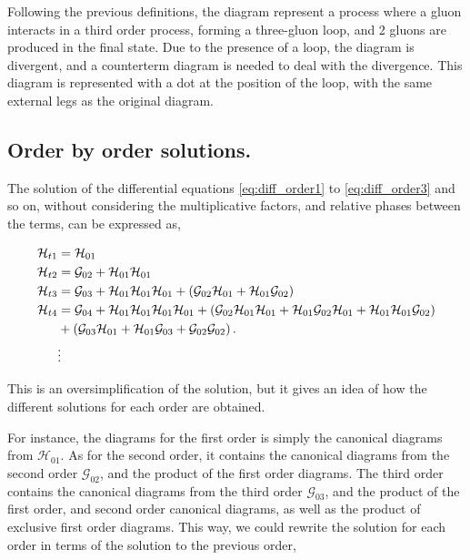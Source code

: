\documentclass[11pt,a4paper,twoside,pdf]{article}
\numberwithin{equation}{section}
\begin{document}
Following the previous definitions, the diagram represent a process where a gluon
interacts in a third order process, forming a three-gluon loop, and 2 gluons are 
produced in the final state. Due to the presence of a loop, the diagram is
divergent, and a counterterm diagram is needed to deal with the divergence. This 
diagram is represented with a dot at the position of the loop, with the same 
external legs as the original diagram. 

\subsection{Order by order solutions.} \label{sec:orderbyorder_solutions}

The solution of the differential equations \eqref{eq:diff_order1} to \eqref{eq:diff_order3} 
and so on, without considering the multiplicative factors, and relative phases between
the terms, can be expressed as,

\begin{align}
    \mathcal{H}_{t1} & = \mathcal{H}_{01} \\
    \mathcal{H}_{t2} & = \mathcal{G}_{02} + \mathcal{H}_{01} 
    \mathcal{H}_{01}\\
    \mathcal{H}_{t3} & = \mathcal{G}_{03} + \mathcal{H}_{01} \mathcal{H}_{01}
    \mathcal{H}_{01} + \left( \mathcal{G}_{02} \mathcal{H}_{01} + 
    \mathcal{H}_{01} \mathcal{G}_{02} \right)\\
    \mathcal{H}_{t4} & = \mathcal{G}_{04} + \mathcal{H}_{01} \mathcal{H}_{01}
    \mathcal{H}_{01} \mathcal{H}_{01} + \left( \mathcal{G}_{02} 
    \mathcal{H}_{01} \mathcal{H}_{01} +  \mathcal{H}_{01} \mathcal{G}_{02}
    \mathcal{H}_{01} + \mathcal{H}_{01} \mathcal{H}_{01} \mathcal{G}_{02} \right) \nonumber\\
    & + \left( \mathcal{G}_{03} \mathcal{H}_{01} + \mathcal{H}_{01} 
    \mathcal{G}_{03} + \mathcal{G}_{02}\mathcal{G}_{02} \right). \\
    &\vdots  \nonumber
\end{align}

This is an oversimplification of the solution, but it gives an idea of how the 
different solutions for each order are obtained. 

For instance, the diagrams for the first order is simply the canonical diagrams from
$\mathcal{H}_{01}$. As for the second order, it contains the canonical diagrams from 
the second order $\mathcal{G}_{02}$, and the product of the first order diagrams. The 
third order contains the canonical diagrams from the third order $\mathcal{G}_{03}$,
and the product of the first order, and second order canonical diagrams, as well as the 
product of exclusive first order diagrams. This way, we could rewrite the solution for 
each order in terms of the solution to the previous order,
\end{document}

